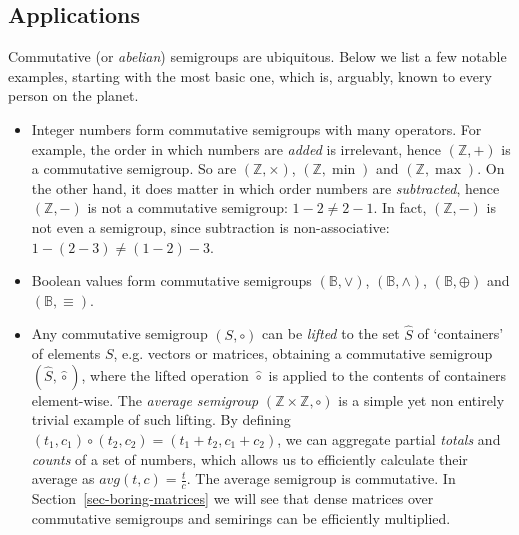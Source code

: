 \documentclass[11pt,letterpaper]{article}
\begin{document}

\subsection{Applications}
Commutative (or \emph{abelian}) semigroups are ubiquitous. Below we list a few
notable examples, starting with the most basic one, which is, arguably, known
to every person on the planet.

\begin{itemize}
  \item Integer numbers form commutative semigroups with many operators. For
  example, the order in which numbers are \emph{added} is irrelevant, hence
  $(\mathbb{Z}, +)$ is a commutative semigroup. So are $(\mathbb{Z}, \times)$,
  $(\mathbb{Z}, \min)$ and $(\mathbb{Z}, \max)$. On the other hand, it does
  matter in which order numbers are \emph{subtracted}, hence $(\mathbb{Z}, -)$
  is not a commutative semigroup: $1-2 \neq 2-1$. In fact, $(\mathbb{Z}, -)$
  is not even a semigroup, since subtraction is non-associative:
  $1-(2-3) \neq (1-2)-3$.

  \item Boolean values form commutative semigroups $(\mathbb{B}, \vee)$,
  $(\mathbb{B}, \wedge)$, $(\mathbb{B}, \oplus)$ and $(\mathbb{B}, \equiv)$.

  \item Any commutative semigroup $(S, \circ)$ can be \emph{lifted} to the set
  $\hat{S}$ of `containers' of elements $S$, e.g. vectors or matrices,
  obtaining a commutative semigroup $(\hat{S}, \hat{\circ})$, where the lifted
  operation $\hat{\circ}$ is applied to the contents of containers element-wise.
  The \emph{average semigroup} $(\mathbb{Z} \times \mathbb{Z}, \circ)$ is a
  simple yet non entirely trivial example of such lifting. By defining
  $(t_1, c_1) \circ (t_2, c_2) = (t_1 + t_2, c_1 + c_2)$, we can aggregate
  partial \emph{totals} and \emph{counts} of a set of numbers, which allows us
  to efficiently calculate their average as $\textit{avg}(t, c) = \frac{t}{c}$.
  The average semigroup is commutative. In Section~\ref{sec-boring-matrices} we
  will see that dense matrices over commutative semigroups and semirings can be
  efficiently multiplied.


\end{itemize}
\end{document}
